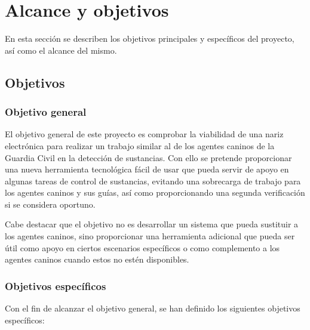 \chapter{Alcance y objetivos}
En esta sección se describen los objetivos principales y específicos del proyecto, así como el alcance del mismo.

\section{Objetivos}

\subsection{Objetivo general}
El objetivo general de este proyecto es comprobar la viabilidad de una nariz electrónica para realizar un trabajo similar al de los agentes caninos de la Guardia Civil en la detección de sustancias. Con ello se pretende proporcionar una nueva herramienta tecnológica fácil de usar que pueda servir de apoyo en algunas tareas de control de sustancias, evitando una sobrecarga de trabajo para los agentes caninos y sus guías, así como proporcionando una segunda verificación si se considera oportuno.
\par

Cabe destacar que el objetivo no es desarrollar un sistema que pueda sustituir a los agentes caninos, sino proporcionar una herramienta adicional que pueda ser útil como apoyo en ciertos escenarios específicos o como complemento a los agentes caninos cuando estos no estén disponibles.

\subsection{Objetivos específicos}
Con el fin de alcanzar el objetivo general, se han definido los siguientes objetivos específicos:

